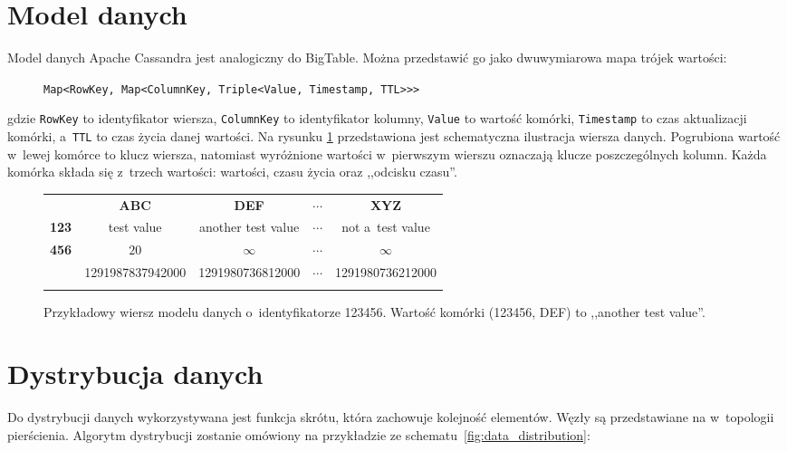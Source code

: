 \section{Model danych}

Model danych Apache Cassandra jest analogiczny do BigTable. \cite{official_bigtable} Można przedstawić go jako dwuwymiarowa mapa trójek wartości:

\begin{figure}[ht!]
	\centering
	\verb+Map<RowKey, Map<ColumnKey, Triple<Value, Timestamp, TTL>>>+
\end{figure}

gdzie \verb+RowKey+ to identyfikator wiersza, \verb+ColumnKey+ to identyfikator kolumny, \verb+Value+ to wartość komórki, \verb+Timestamp+ to czas aktualizacji komórki, a~\verb+TTL+ to czas życia danej wartości. \cite{mc_fadin_long_live_data_model} Na rysunku \ref{fig:data_model_example} przedstawiona jest schematyczna ilustracja wiersza danych. Pogrubiona wartość w~lewej komórce to klucz wiersza, natomiast wyróżnione wartości w~pierwszym wierszu oznaczają klucze poszczególnych kolumn. Każda komórka składa się z~trzech wartości: wartości, czasu życia oraz ,,odcisku czasu''.

\begin{figure}[ht!]
	\centering
	\begin{tabular}{|l||c|c|c|c|}
		\hhline{|-||----|}
		& \textbf{ABC} & \textbf{DEF} & $\cdots$ & \textbf{XYZ} \\
		\hhline{|~||====|}
		\textbf{123} & test value & another test value & $\cdots$ & not a~test value \\
		\cline{2-5}
		\textbf{456} & $20$ & $\infty$ & $\cdots$ & $\infty$ \\
		\cline{2-5}
		& 1291987837942000 & 1291980736812000 & $\cdots$ & 1291980736212000 \\
		\hhline{|-||----|}
	\end{tabular}

	\caption{Przykładowy wiersz modelu danych o~identyfikatorze 123456. Wartość komórki (123456, DEF) to ,,another test value''.}
	\label{fig:data_model_example}
\end{figure}

\section{Dystrybucja danych}

Do dystrybucji danych wykorzystywana jest funkcja skrótu, która zachowuje kolejność elementów. Węzły są przedstawiane na w~topologii pierścienia. Algorytm dystrybucji zostanie omówiony na przykładzie ze schematu~\ref{fig:data_distribution}: 

